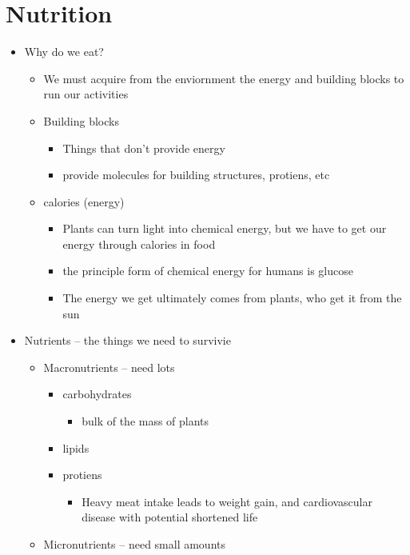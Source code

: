 \documentclass{article}
\theoremstyle{definition}
\begin{document}
\section{Nutrition}
\begin{itemize}
	\item Why do we eat?
		\begin{itemize}
			\item We must acquire from the enviornment the energy and building blocks to run our activities
			\item Building blocks
				\begin{itemize}
					\item Things that don't provide energy
					\item provide molecules for building structures, protiens, etc
				\end{itemize}
			\item calories (energy)
				\begin{itemize}
					\item Plants can turn light into chemical energy, but we have to get our energy through calories in food
					\item the principle form of chemical energy for humans is glucose
					\item The energy we get ultimately comes from plants, who get it from the sun
				\end{itemize}
		\end{itemize}
	\item Nutrients -- the things we need to survivie
		\begin{itemize}
			\item Macronutrients -- need lots
				\begin{itemize}
					\item carbohydrates
						\begin{itemize}
							\item bulk of the mass of plants
						\end{itemize}
					\item lipids
					\item protiens
						\begin{itemize}
							\item Heavy meat intake leads to weight gain, and cardiovascular disease with potential shortened life
						\end{itemize}
				\end{itemize}
			\item Micronutrients -- need small amounts
				\begin{itemize}

\end{itemize}
\end{itemize}
\end{itemize}
\end{document}
